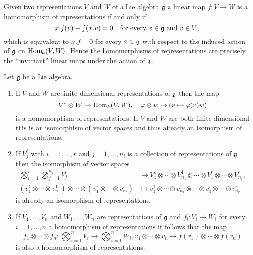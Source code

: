 \begin{rem}
 Given two representations $V$ and $W$ of a Lie algebra $\mathfrak{g}$ a linear map $f \colon V \to W$ is a homomorphism of representations if and only if
 \[
  x.f(v) - f(x.v) = 0 \quad \text{for every $x \in \mathfrak{g}$ and $v \in V$},
 \]
 which is equivalent to $x.f = 0$ for every $x \in \mathfrak{g}$ with respect to the induced action of $\mathfrak{g}$ on $\operatorname{Hom}_k(V,W)$. Hence the homomorphisms of representations are precisely the ``invariant'' linear maps under the action of $\mathfrak{g}$.
\end{rem}



\begin{prop}
 Let $\mathfrak{g}$ be a Lie algebra.
 \begin{enumerate}[leftmargin=*]
  \item
   If $V$ and $W$ are finite dimensional representations of $\mathfrak{g}$ then the map
   \[
    V^* \otimes W \to \operatorname{Hom}_k(V,W), \quad \varphi \otimes w \mapsto (v \mapsto \varphi(v) w)
   \]
   is a homomorphism of representations. If $V$ and $W$ are both finite dimensional this is an isomorphism of vector spaces and thus already an isomorphism of representations.
  \item
   If $V^i_j$ with $i = 1, \dotsc, r$ and $j = 1, \dotsc, n_i$ is a collection of representations of $\mathfrak{g}$ then the isomorphism of vector spaces
   \begin{align*}
    \bigotimes_{i=1}^r \bigotimes_{j=1}^{n_j} V^{i}_j
    &\to V^1_1 \otimes \dotsb \otimes V^1_{n_1} \otimes \dotsb \otimes V^r_1 \otimes \dotsb \otimes V^{r}_{n_r}, \\
    (v^1_1 \otimes \dotsb \otimes v^1_{n_1}) \otimes \dotsb \otimes (v^r_1 \otimes \dotsb \otimes v^r_{n_r})
    &\mapsto v^1_1 \otimes \dotsb \otimes v^1_{n_1} \otimes \dotsb \otimes v^r_1 \otimes \dotsb \otimes v^r_{n_r}
   \end{align*}
   is already an isomorphism of representations.
  \item
   If $V_1, \dotsc, V_n$ and $W_1, \dotsc, W_n$ are representations of $\mathfrak{g}$ and $f_i \colon V_i \to W_i$ for every $i = 1, \dotsc, n$ a homomorphism of representations it follows that the map
   \[
    f_1 \otimes \dotsb \otimes f_n \colon \bigotimes_{i=1}^n V_i \to \bigotimes_{i=1}^n W_i,
    v_1 \otimes \dotsb \otimes v_n \mapsto f(v_1) \otimes \dotsb \otimes f(v_n)
   \]
   is also a homomorphism of representations.
 \end{enumerate}
\end{prop}





